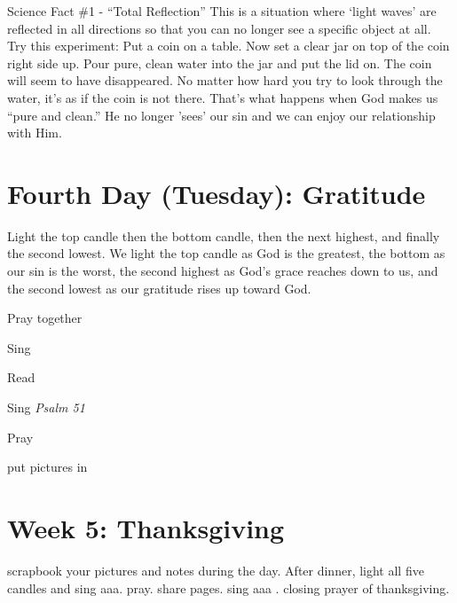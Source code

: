 Science Fact \#1 - ``Total Reflection''
This is a situation where `light waves' are reflected in all directions so that you can no longer see a specific object at all. Try this experiment: Put a coin on a table. Now set a clear jar on top of the coin right side up. Pour pure, clean water into the jar and put the lid on. The coin will seem to have disappeared. No matter how hard you try to look through the water, it's as if the coin is not there. That's what happens when God makes us ``pure and clean.'' He no longer 'sees' our sin and we can enjoy our relationship with Him.

\clearpage
\section{Fourth Day (Tuesday): Gratitude}

\noindent Light the top candle then the bottom candle, then the next highest, and finally the second lowest.  We light the top candle as God is the greatest, the bottom as our sin is the worst, the second highest as God's grace reaches down to us, and the second lowest as our gratitude rises up toward God.



\noindent Pray together


\noindent Sing \emph{}



\noindent Read


\noindent Sing \emph{Psalm 51}


\noindent Pray


put pictures in

\clearpage
\section{Week 5: Thanksgiving}

scrapbook your pictures and notes during the day.  After dinner, light all five candles and sing aaa. pray. share pages.  sing aaa . closing prayer of thanksgiving.




